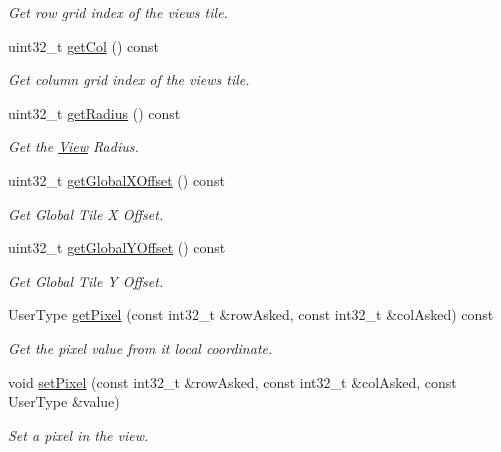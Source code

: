 \begin{DoxyCompactItemize}
\begin{DoxyCompactList}\small\item\em Get row grid index of the view\textquotesingle{}s tile. \end{DoxyCompactList}\item 
uint32\+\_\+t \hyperlink{classfi_1_1View_a40f94b02c882acb3be8623781b912cb2}{get\+Col} () const
\begin{DoxyCompactList}\small\item\em Get column grid index of the view\textquotesingle{}s tile. \end{DoxyCompactList}\item 
uint32\+\_\+t \hyperlink{classfi_1_1View_a5fb12e145b33bc8b27a58d56d23fb774}{get\+Radius} () const
\begin{DoxyCompactList}\small\item\em Get the \hyperlink{classfi_1_1View}{View} Radius. \end{DoxyCompactList}\item 
uint32\+\_\+t \hyperlink{classfi_1_1View_ae904f2103857876c460a3d9cb09c463b}{get\+Global\+X\+Offset} () const
\begin{DoxyCompactList}\small\item\em Get Global Tile X Offset. \end{DoxyCompactList}\item 
uint32\+\_\+t \hyperlink{classfi_1_1View_a6cb46dcea151973eb4ebc0160586b16e}{get\+Global\+Y\+Offset} () const
\begin{DoxyCompactList}\small\item\em Get Global Tile Y Offset. \end{DoxyCompactList}\item 
User\+Type \hyperlink{classfi_1_1View_a5b05f97a8d0a58a8126911a0467f4544}{get\+Pixel} (const int32\+\_\+t \&row\+Asked, const int32\+\_\+t \&col\+Asked) const
\begin{DoxyCompactList}\small\item\em Get the pixel value from it local coordinate. \end{DoxyCompactList}\item 
void \hyperlink{classfi_1_1View_a8ed9ab561cde1f356fab4500e987ad46}{set\+Pixel} (const int32\+\_\+t \&row\+Asked, const int32\+\_\+t \&col\+Asked, const User\+Type \&value)
\begin{DoxyCompactList}\small\item\em Set a pixel in the view. \end{DoxyCompactList}\item 

\end{DoxyCompactItemize}
